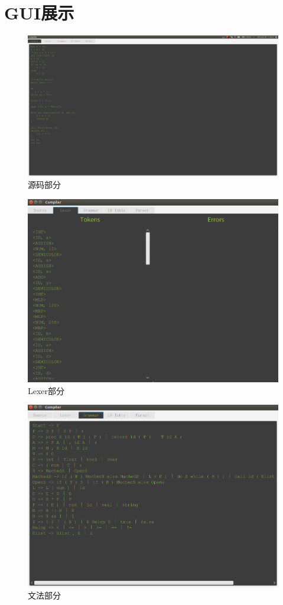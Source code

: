 \documentclass{ML}
\begin{document}
\section{GUI展示}
\begin{figure}[H]
    \centering
    \includegraphics[width=1\linewidth]{media/compiler-source.png}
    \caption{源码部分}
\end{figure}
\begin{figure}[H]
    \centering
    \includegraphics[width=1\linewidth]{media/compiler-lexer.png}
    \caption{Lexer部分}
\end{figure}
\begin{figure}[H]
    \centering
    \includegraphics[width=1\linewidth]{media/compiler-grammar.png}
    \caption{文法部分}
\end{figure}
\end{document}
